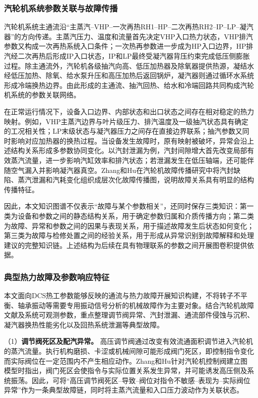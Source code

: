 \subsubsection{汽轮机系统参数关联与故障传播}

汽轮机系统主通流沿“主蒸汽--VHP--一次再热RH1--HP--二次再热RH2--IP--LP--凝汽器”的方向传递。主蒸汽压力、温度和流量首先决定VHP入口热力状态，VHP排汽参数又构成一次再热系统入口条件；一次热再参数进一步成为HP入口边界，HP排汽经二次再热后形成IP入口状态，IP和LP最终受凝汽器背压约束完成低压侧膨胀过程。除主通流外，汽轮机各级抽汽向高、低压加热器及除氧器提供热源，凝结水经低压加热、除氧、给水泵升压和高压加热后返回锅炉，凝汽器则通过循环水系统形成冷端换热边界。由此形成的主通流、抽汽回热、给水和冷端回路共同构成汽轮机系统的参数关联网络。

在正常运行情况下，设备入口边界、内部状态和出口状态之间存在相对稳定的热力映射。例如，VHP主蒸汽边界与叶片级压力、排汽温度及一级抽汽状态具有确定的工况相关性；LP末级状态与凝汽器压力之间存在直接边界联系；抽汽参数又同时影响对应加热器的换热过程。当设备发生故障时，原有映射被破坏，异常会沿上述结构关系形成多参数协同变化。以汽封泄漏为例，汽封间隙增大首先改变局部有效蒸汽流量，进一步影响汽缸效率和排汽状态；若泄漏发生在低压轴端，还可能伴随空气漏入并影响凝汽器真空。Zhang和Hu在汽轮机故障传播研究中将汽封缺陷、蒸汽泄漏和汽耗变化组织成层次化故障传播图，说明故障关系具有明显的结构传播特征\cite{ZhangHu2021FaultPropagationGNN}。

因此，本文知识图谱不仅表示“故障与某个参数相关”，还同时保存三类知识：第一类为设备和参数之间的静态结构关系，用于确定参数归属和介质传播方向；第二类为故障、异常和参数之间的因果与表现关系，用于描述故障发生后状态如何变化；第三类为故障与检修处置之间的经验关系，用于形成从异常识别到故障解释和处理建议的完整知识链。上述结构为后续在具有物理联系的参数之间开展图卷积提供依据。

\subsubsection{典型热力故障及参数响应特征}

本文面向DCS热工参数能够反映的通流与热力故障开展知识构建，不将转子不平衡、轴承振动等需要专用振动信号分析的机械故障作为主要对象。结合汽轮机故障文献及系统可观测参数，重点整理调节阀异常、汽封泄漏、通流部件侵蚀与沉积、凝汽器换热性能劣化以及回热系统泄漏等典型故障。

（1）\textbf{调节阀死区及配汽异常。} 高压调节阀通过改变有效流通面积调节进入汽轮机的蒸汽流量。执行机构磨损、卡涩或机械间隙可能形成阀门死区，即控制指令变化而实际阀位在一定范围内不产生相应动作。Zhang和Hu针对汽轮机控制阀建立图模型时指出，阀门死区会使指令与实际位置关系发生异常，并可能诱发高压侧及系统振荡\cite{ZhangHu2021ControlValveGraph}。因此，可将“高压调节阀死区--导致--阀位对指令不敏感--表现为--实际阀位异常”作为一条典型故障链，同时将主蒸汽流量和入口压力波动作为关联状态。

